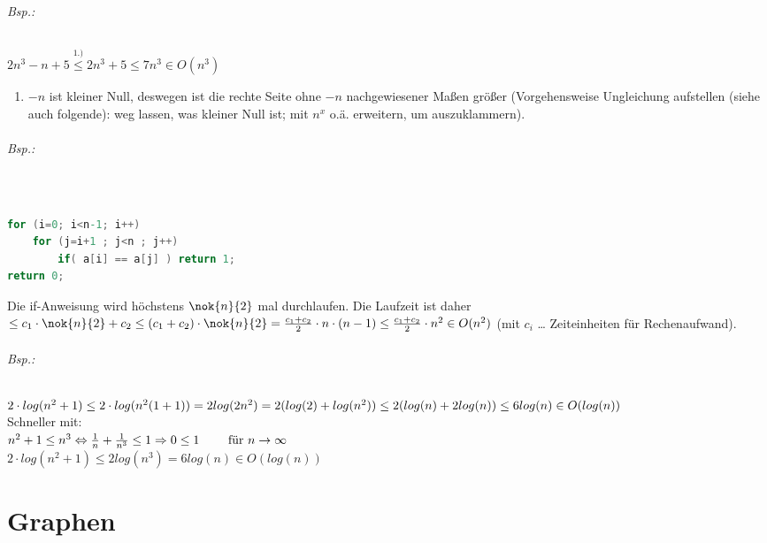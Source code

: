 \documentclass{scrreprt}
\begin{document}
\subparagraph{Bsp.:} $2n^3-n+5\overset{1.)}{\leq} 2n^3+5 \leq 7n^3 \in O(n^3)$
\begin{enumerate}
\item $-n$ ist kleiner Null, deswegen ist die rechte Seite ohne $-n$ nachgewiesener Maßen größer (Vorgehensweise Ungleichung aufstellen (siehe auch folgende): weg lassen, was kleiner Null ist; mit $n^x$ o.ä. erweitern, um auszuklammern).
\end{enumerate}

\subparagraph{Bsp.:}$ $
\begin{lstlisting}[language=C]
for (i=0; i<n-1; i++)
	for (j=i+1 ; j<n ; j++)
		if( a[i] == a[j] ) return 1;
return 0;
\end{lstlisting}
Die if-Anweisung wird höchstens $\nok{n}{2}$ mal durchlaufen. Die Laufzeit ist daher $\leq c_1 \cdot \nok{n}{2} + c_2 \leq (c_1+c_2) \cdot \nok{n}{2} = \frac{c_1+c_2}{2}\cdot n \cdot (n-1)\leq \frac{c_1 + c_2}{2}\cdot n^2 \in O(n^2)$ (mit $c_i$ … Zeiteinheiten für Rechenaufwand).
\subparagraph{Bsp.:} $2\cdot log(n^2+1)\\
\leq 2 \cdot log (n^2(1+1))\\
=2log(2n^2)=2(log(2)+log(n^2)) \\
\leq 2(log(n)+2log(n))\\
\leq 6 log(n) \in O(log(n))$\\
Schneller mit:\\
$n^2+1\leq n^3 \Leftrightarrow \\
\frac{1}{n}+\frac{1}{n^3}\leq 1 \Rightarrow \\
0\leq 1 \qquad \text{ für } n \rightarrow\infty$\\
$2\cdot log(n^2+1)\leq 2 log (n^3)=6log(n)\in O(log(n))$

\chapter{Graphen}
\end{document}
